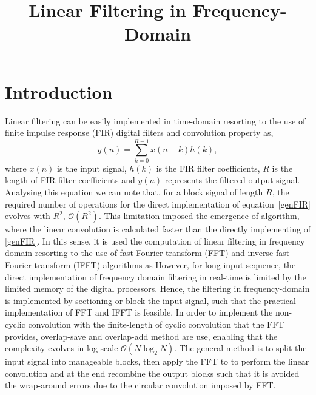 \documentclass[a4paper]{article}
\title{Linear Filtering in Frequency-Domain}
\author{ }
\date{ }
\begin{document}
\maketitle
\section{Introduction}
Linear filtering can be easily implemented in time-domain resorting to the use of finite impulse response (FIR) digital filters and convolution property as,
\begin{equation}
    y(n)= \sum\limits_{k=0}^{R-1} x(n-k)h\left(k\right),
    \label{genFIR}
\end{equation}
where $x(n)$ is the input signal, $h(k)$ is the FIR filter coefficients, $R$ is the length of FIR filter coefficients and $y(n)$ represents the filtered output signal.
Analysing this equation we can note that, for a block signal of length $R$, the required number of operations for the direct implementation of equation~\eqref{genFIR} evolves with $R^2$, $\mathcal{O}(R^2)$. This limitation imposed the emergence of algorithm, where the linear convolution is calculated faster than the directly implementing of \eqref{genFIR}.
In this sense, it is used the computation of linear filtering in frequency domain resorting to the use of fast Fourier transform (FFT) and inverse fast Fourier transform (IFFT) algorithms as
However, for long input sequence, the direct implementation of frequency domain filtering in real-time is limited by the limited memory of the digital processors.
Hence, the filtering in frequency-domain is implemented by sectioning or block the input signal, such that the practical implementation  of FFT and IFFT is feasible. In order to implement the non-cyclic convolution with the finite-length of cyclic convolution that the FFT provides, overlap-save and overlap-add method are use, enabling that the complexity evolves in log scale $\mathcal{O}(N\log_2N)$. The general method is to split the input signal into manageable blocks, then apply the FFT to to perform the linear convolution and at the end recombine the output blocks such that it is avoided the wrap-around errors due to the circular convolution imposed by FFT.
\end{document}
